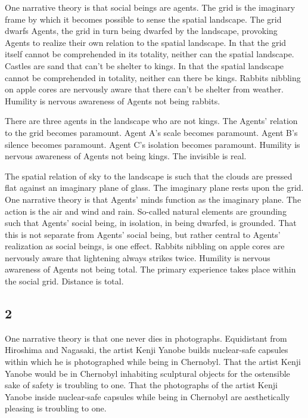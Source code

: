 One narrative theory is that social beings are agents. The grid is the
imaginary frame by which it becomes possible to sense the spatial
landscape. The grid dwarfs Agents, the grid in turn being dwarfed by the
landscape, provoking Agents to realize their own relation to the spatial
landscape. In that the grid itself cannot be comprehended in its
totality, neither can the spatial landscape. Castles are sand that can't
be shelter to kings. In that the spatial landscape cannot be
comprehended in totality, neither can there be kings. Rabbits nibbling
on apple cores are nervously aware that there can't be shelter from
weather. Humility is nervous awareness of Agents not being rabbits.

There are three agents in the landscape who are not kings. The Agents'
relation to the grid becomes paramount. Agent A's scale becomes
paramount. Agent B's silence becomes paramount. Agent C's isolation
becomes paramount. Humility is nervous awareness of Agents not being
kings. The invisible is real.

The spatial relation of sky to the landscape is such that the clouds are
pressed flat against an imaginary plane of glass. The imaginary plane
rests upon the grid. One narrative theory is that Agents' minds function
as the imaginary plane. The action is the air and wind and rain.
So-called natural elements are grounding such that Agents' social being,
in isolation, in being dwarfed, is grounded. That this is not separate
from Agents' social being, but rather central to Agents' realization as
social beings, is one effect. Rabbits nibbling on apple cores are
nervously aware that lightening always strikes twice. Humility is
nervous awareness of Agents not being total. The primary experience
takes place within the social grid. Distance is total.

\hypertarget{section-3}{%
\subsection{2}\label{section-3}}

One narrative theory is that one never dies in photographs. Equidistant
from Hiroshima and Nagasaki, the artist Kenji Yanobe builds nuclear-safe
capsules within which he is photographed while being in Chernobyl. That
the artist Kenji Yanobe would be in Chernobyl inhabiting sculptural
objects for the ostensible sake of safety is troubling to one. That the
photographs of the artist Kenji Yanobe inside nuclear-safe capsules
while being in Chernobyl are aesthetically pleasing is troubling to one.

